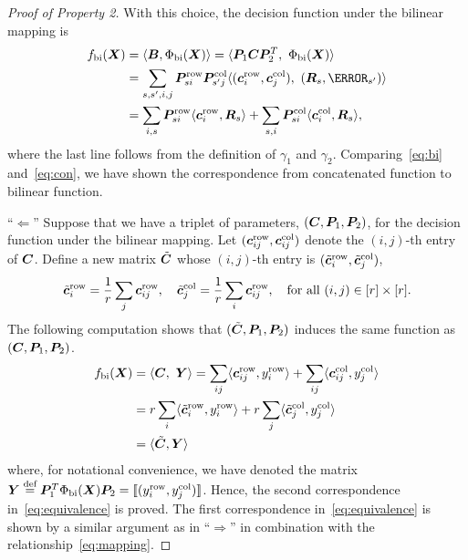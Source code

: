 \documentclass[11pt]{article}
\theoremstyle{plain}
\theoremstyle{definition}
\begin{document}
\begin{proof}[Proof of Property 2]
With this choice, the decision function under the bilinear mapping is
\begin{align}\label{eq:bi}
f_{\text{bi}}(\mX)&=\langle\mB, \Phi_{\text{bi}}(\mX) \rangle=\langle \mP_1\mC\mP^T_2,\ \Phi_{\text{bi}}(\mX) \rangle \notag \\
&=\sum_{s,s',i,j} \mP^{\text{row}}_{si} \mP^{\text{col}}_{s'j}  \langle (\mc^{\text{row}}_{i}, \mc^{\text{col}}_{j}),\ (\mR_s, \mL_{s'}) \rangle\notag\\
&=\sum_{i,s}\mP^{\text{row}}_{si} \langle\mc^{\text{row}}_{i},\mR_s\rangle+  \sum_{s,i}\mP^{\text{col}}_{si} \langle\mc^{\text{col}}_{i},\mR_{s}\rangle,
\end{align}
where the last line follows from the definition of $\gamma_1$ and $\gamma_2$. Comparing~\eqref{eq:bi} and~\eqref{eq:con}, we have shown the correspondence from concatenated function to bilinear function. 

``$\Leftarrow$'' Suppose that we have a triplet of parameters, $(\bm C, \bm{P}_1,\bm{P}_2)$, for the decision function under the bilinear mapping. Let $(\bm{c}^{\text{row}}_{ij},\bm{c}^{\text{col}}_{ij})$ denote the $(i,j)$-th entry of $\bm C$. Define a new matrix $\tilde {\bm C}$ whose $(i,j)$-th entry is $(\tilde{\bm{c}}^{\text{row}}_i , \tilde{\bm{c}}^{\text{col}}_j)$,
\[
\tilde {\bm{c}}^{\text{row}}_i  = {1\over r} \sum_{j} \bm{c}^{\text{row}}_{ij},\quad \tilde {\bm{c}}^{\text{col}}_j  = {1\over r} \sum_{i} \bm{c}^{\text{row}}_{ij}, \quad \text{for all }(i,j)\in[r]\times [r].
\]
The following computation shows that $(\tilde {\bm C},\bm{P}_1,\bm{P}_2)$ induces the same function as $(\bm C,\bm{P}_1,\bm{P}_2)$. 
\begin{align}
f_{\text{bi}}(\bm X)&=\langle \bm C,\ \bm Y\rangle=\sum_{ij} \langle \bm{c}^{\text{row}}_{ij}, y^{\text{row}}_{i}\rangle +\sum_{ij} \langle \bm{c}^{\text{col}}_{ij}, y^{\text{col}}_{j}\rangle \\
&= r \sum_i  \langle \tilde {\bm{c}}^{\text{row}}_i, y^{\text{row}}_i\rangle+r \sum_j \langle \tilde {\bm{c}}^{\text{col}}_j, y^{\text{col}}_j\rangle\\
&= \langle\tilde {\bm C}, \bm Y\rangle 
\end{align}
where, for notational convenience, we have denoted the matrix $\bm Y\stackrel{\text{def}}{=}\bm{P}^T_1\Phi_{\text{bi}}(\bm X)\bm{P}_2 = \llbracket (y^{\text{row}}_i, y^{\text{col}}_j) \rrbracket$. Hence, the second correspondence in~\eqref{eq:equivalence} is proved. The first correspondence in~\eqref{eq:equivalence} is shown by a similar argument as in ``$\Rightarrow$'' in combination with the relationship~\eqref{eq:mapping}. 
\end{proof}
\end{document}
